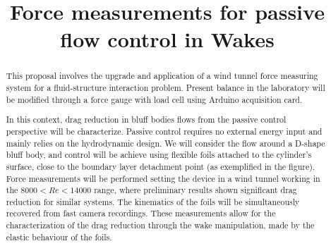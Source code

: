 \documentclass[english,12pt,a4paper]{article}
\begin{document}
	
	
	
	\title{Force measurements for passive flow control in Wakes}
	\date{}
	\maketitle
	\vspace{-1 cm}
	
	
	\begin{abstract}
		
		This proposal involves the upgrade and application of a wind tunnel  force measuring system  for a fluid-structure interaction problem. Present balance in the laboratory will be modified through a force gauge with load cell using Arduino acquisition card.
		
		In this context, drag reduction in bluff bodies flows from the passive control perspective will be characterize. Passive control requires no external energy input and mainly relies on the hydrodynamic design. We will consider the flow around a D-shape bluff body, and control will be achieve using flexible foils attached to the cylinder's surface, close to the boundary layer detachment point (as exemplified in the figure). Force measurements will be performed setting the device in a wind tunnel working in the $8000<Re<14000$ range, where preliminary results shown significant drag reduction for similar systems. The kinematics of the foils will be simultaneously recovered from fast camera recordings. These measurements allow for the characterization of the drag reduction through the wake manipulation, made by the elastic behaviour of the foils. 
		
		\begin{figure}[htb]
\centering\resizebox{.7\columnwidth}{!}{%
			
}
		\end{figure}
	\end{abstract}
	
\end{document}
